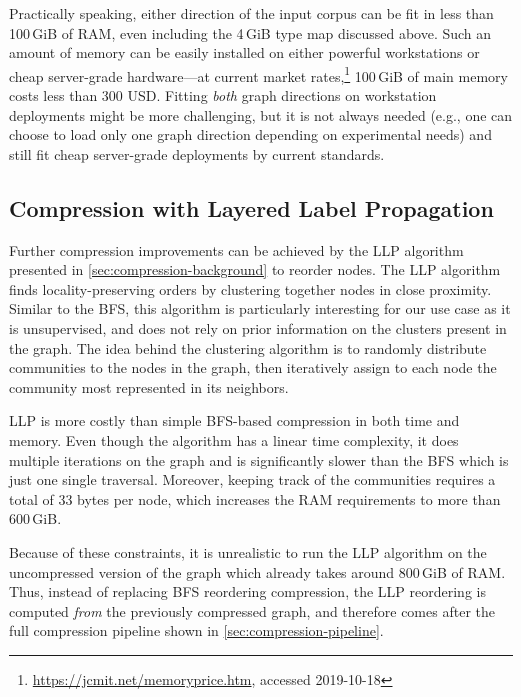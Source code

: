 Practically speaking, either direction of the input corpus can be fit in less
than 100\,GiB of RAM, even including the 4\,GiB type map discussed above. Such an
amount of memory can be easily installed on either powerful workstations or
cheap server-grade hardware---at current market
rates,\footnote{\url{https://jcmit.net/memoryprice.htm}, accessed 2019-10-18}
100\,GiB of main memory costs less than 300 USD\@. Fitting \emph{both}
graph directions on workstation deployments might be more challenging, but it
is not always needed (e.g., one can choose to load only one graph direction
depending on experimental needs) and still fit cheap server-grade deployments
by current standards.

\subsection{Compression with Layered Label Propagation}%
\label{sec:llp-compression}

Further compression improvements can be achieved by the \acrfull{LLP}
algorithm~\cite{BRSLLP} presented in \cref{sec:compression-background}
to reorder nodes. The \gls{LLP} algorithm finds locality-preserving orders by
clustering together nodes in close proximity.  Similar to the \gls{BFS}, this
algorithm is particularly interesting for our use case as it is unsupervised,
and does not rely on prior information on the clusters present in the graph.
The idea behind the clustering algorithm is to randomly distribute communities
to the nodes in the graph, then iteratively assign to each node the community
most represented in its neighbors.

\gls{LLP} is more costly than simple \gls{BFS}-based compression in both time
and memory. Even though the algorithm has a linear time complexity, it does
multiple iterations on the graph and is significantly slower than the \gls{BFS}
which is just one single traversal.  Moreover, keeping track of the communities
requires a total of 33 bytes per node, which increases the RAM requirements to
more than 600\,GiB.

Because of these constraints, it is unrealistic to run the \gls{LLP} algorithm
on the uncompressed version of the graph which already takes around 800\,GiB of
RAM\@. Thus, instead of replacing \gls{BFS} reordering compression, the
\gls{LLP} reordering is computed \emph{from} the previously compressed graph,
and therefore comes after the full compression pipeline shown in
\cref{sec:compression-pipeline}.

